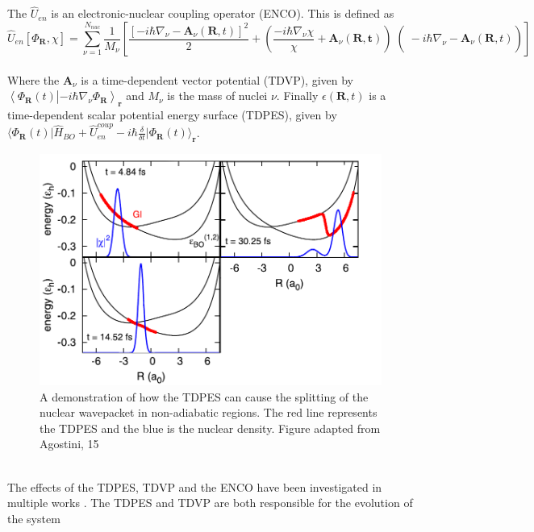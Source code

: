 The $\hat{U}_{en}$ is an electronic-nuclear coupling operator (ENCO). This is defined as \begin{equation}
  \hat{U}_{en}[\Phi_{\mathbf{R}}, \chi] = \sum_{\nu=1}^{N_{nuc}} \frac{1}{M_{\nu}} \left[ \frac{\left[-i \hbar \nabla_{\nu} - \mathbf{A}_{\nu}(\mathbf{R}, t) \right]^2}{2} + \left( \left. \left. \frac{-i\hbar \nabla_{\nu} \chi}{\chi} + \mathbf{A}_{\nu}(\mathbf{R, t})\right)\right( -i\hbar\nabla_{\nu} -            \mathbf{A}_{\nu}(\mathbf{R}, t)\right) \right]
  \label{eq:ENCO}
\end{equation}
\\
Where the $\mathbf{A}_{\nu}$ is a time-dependent vector potential (TDVP), given by $\left\langle \Phi_{\mathbf{R}}(t) \right\vert \left. - i \hbar \nabla_{\nu} \Phi_{\mathbf{R}} \right\rangle_{\mathbf{r}}$ and $M_{\nu}$ is the mass of nuclei $\nu$.
Finally $\epsilon(\mathbf{R}, t)$ is a time-dependent scalar potential energy surface (TDPES), given by $\langle \Phi_{\mathbf{R}}(t) \vert \hat{H}_{BO} + \hat{U}_{en}^{coup} - i\hbar \frac{\delta}{\delta t} \vert \Phi_{\mathbf{R}}(t) \rangle_{\mathbf{r}}$.
\\
\begin{figure}[htp]
  \includegraphics[width=\textwidth]{./img/CTMQC/nuclear_splitting_TDPES.png}
  \caption{A demonstration of how the TDPES can cause the splitting of the nuclear wavepacket in non-adiabatic regions. The red line represents the TDPES and the blue is the nuclear density. Figure adapted from Agostini, 15 \cite{agostini_exact_2015} \label{fig:step_TDPES}}
\end{figure}
\\
The effects of the TDPES, TDVP and the ENCO have been investigated in multiple works \cite{agostini_semiclassical_2015, agostini_exact_2015, agostini_mixed_2013, abedi_dynamical_2013, Min2014Dec}. The TDPES and TDVP are both responsible for the evolution of the system

